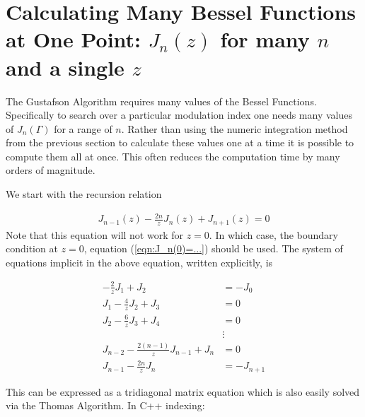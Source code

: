 \documentclass[onecolumn, groupedaddress, 10pt]{revtex4-1}
\begin{document}
\section{Calculating Many Bessel Functions at One Point: $J_n(z)$ for many $n$ and a single $z$ \label{sec:calcBesselConstZ}}
The Gustafson Algorithm requires many values of the Bessel Functions.  Specifically to search over a particular modulation index one needs many values of $J_n(\Gamma)$ for a range of $n$.  Rather than using the numeric integration method from the previous section to calculate these values one at a time it is possible to compute them all at once.  This often reduces the computation time by many orders of magnitude.

We start with the recursion relation

\begin{align}
J_{n-1}(z) -\frac{2n}{z} J_n(z) + J_{n+1}(z) = 0
\end{align}
Note that this equation will not work for $z=0$.  In which case, the boundary condition at $z=0$, equation (\ref{eqn:J_n(0)=...}) should be used.  The system of equations implicit in the above equation, written explicitly, is

\begin{align}
        - \frac{2}{z} J_1          + J_2   &= - J_0		\\
J_1     - \frac{4}{z} J_2          + J_3   &= 0			\\
J_2     - \frac{6}{z} J_3          + J_4   &= 0			\\
                                           &\vdots		\\
J_{n-2} - \frac{2(n-1)}{z} J_{n-1} + J_{n} &=   0			\\
J_{n-1} - \frac{2n}{z}     J_n             &= - J_{n+1}
\end{align}

This can be expressed as a tridiagonal matrix equation which is also easily solved via the Thomas Algorithm.  In C++ indexing:
\end{document}
